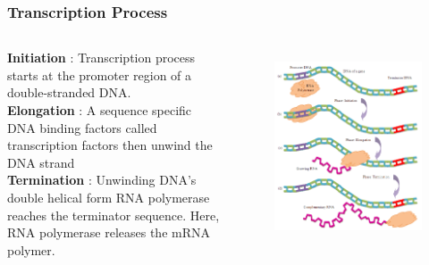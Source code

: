 \documentclass{beamer}
\begin{document}
\begin{frame}
\frametitle{Transcription Process}
\begin{columns}[c] %

{\bf Initiation} : Transcription process starts at the promoter region of a double-stranded DNA. \\
{\bf Elongation} : A sequence specific DNA binding factors called {\color{red}transcription factors} then unwind the DNA strand\\
{\bf Termination} : Unwinding DNA's double helical form RNA polymerase reaches the terminator sequence. Here, RNA polymerase releases the mRNA polymer.


\begin{figure}[t]
\centering
\includegraphics[scale=.24]{diagrams/transcriptionProcess.png}
\label{fig:transcriptionProcess}
\end{figure}

\end{columns}
\end{frame}
\end{document}
